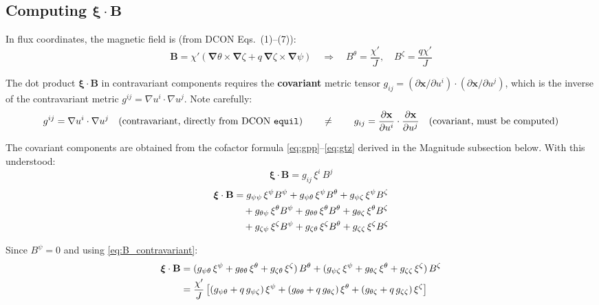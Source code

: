 \documentclass[12pt,a4paper]{article}
\newcommand{\bnabla}{\boldsymbol{\nabla}}
\newcommand{\bxi}{\boldsymbol{\xi}}
\begin{document}
\subsection{Computing $\bxi\cdot\mathbf{B}$}

In flux coordinates, the magnetic field is (from DCON Eqs.~(1)--(7)):
\begin{equation}
    \mathbf{B} = \chi'\!\left(\bnabla\theta\times\bnabla\zeta + q\,\bnabla\zeta\times\bnabla\psi\right)
    \quad\Longrightarrow\quad
    B^\theta = \frac{\chi'}{J},\quad B^\zeta = \frac{q\chi'}{J}
    \label{eq:B_contravariant}
\end{equation}

The dot product $\bxi\cdot\mathbf{B}$ in contravariant components requires the \textbf{covariant} metric tensor $g_{ij} = (\partial\mathbf{x}/\partial u^i)\cdot(\partial\mathbf{x}/\partial u^j)$, which is the inverse of the contravariant metric $g^{ij} = \nabla u^i\cdot\nabla u^j$. Note carefully:
\begin{equation}
    g^{ij} = \nabla u^i\cdot\nabla u^j \quad\text{(contravariant, directly from DCON \texttt{equil})}
    \qquad \neq \qquad
    g_{ij} = \frac{\partial\mathbf{x}}{\partial u^i}\cdot\frac{\partial\mathbf{x}}{\partial u^j} \quad\text{(covariant, must be computed)}
\end{equation}

The covariant components are obtained from the cofactor formula \eqref{eq:gpp}--\eqref{eq:gtz} derived in the Magnitude subsection below. With this understood:
\begin{equation}
    \bxi\cdot\mathbf{B} = g_{ij}\,\xi^i\,B^j
\end{equation}
\begin{align}
    \bxi\cdot\mathbf{B} &= g_{\psi\psi}\,\xi^\psi B^\psi + g_{\psi\theta}\,\xi^\psi B^\theta + g_{\psi\zeta}\,\xi^\psi B^\zeta \notag\\
    &\quad + g_{\theta\psi}\,\xi^\theta B^\psi + g_{\theta\theta}\,\xi^\theta B^\theta + g_{\theta\zeta}\,\xi^\theta B^\zeta \notag\\
    &\quad + g_{\zeta\psi}\,\xi^\zeta B^\psi + g_{\zeta\theta}\,\xi^\zeta B^\theta + g_{\zeta\zeta}\,\xi^\zeta B^\zeta
\end{align}

Since $B^\psi = 0$ and using \eqref{eq:B_contravariant}:
\begin{align}
    \bxi\cdot\mathbf{B} &= (g_{\psi\theta}\,\xi^\psi + g_{\theta\theta}\,\xi^\theta + g_{\zeta\theta}\,\xi^\zeta)\,B^\theta
                         + (g_{\psi\zeta}\,\xi^\psi + g_{\theta\zeta}\,\xi^\theta + g_{\zeta\zeta}\,\xi^\zeta)\,B^\zeta \notag\\
    &= \frac{\chi'}{J}\left[
        (g_{\psi\theta} + q\,g_{\psi\zeta})\,\xi^\psi
        + (g_{\theta\theta}+q\,g_{\theta\zeta})\,\xi^\theta
        + (g_{\theta\zeta}+q\,g_{\zeta\zeta})\,\xi^\zeta
    \right]
    \label{eq:xidotB_full}
\end{align}
\end{document}

